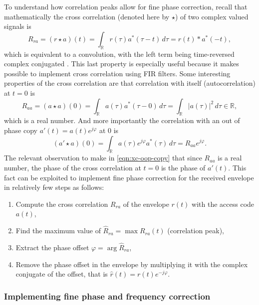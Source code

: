 To understand how correlation peaks allow for fine phase correction, recall that mathematically the cross correlation (denoted here by \(\star\)) of two complex valued signals is
\begin{equation}
	R_{ra}
	= (r \star a)(t)
	= \int_\mathbb{R} r(\tau) a^*(\tau - t) \,d\tau
	= r(t) * a^*(-t),
\end{equation}
which is equivalent to a convolution, with the left term being time-reversed complex conjugated \cite{Gallager}. This last property is especially useful because it makes possible to implement cross correlation using FIR filters. Some interesting properties of the cross correlation are that correlation with itself (autocorrelation) at \(t = 0\) is
\begin{equation}
	R_{aa} = (a \star a)(0)
	= \int_\mathbb{R} a(\tau) a^*(\tau - 0) \,d\tau
	= \int_\mathbb{R} |a(\tau)|^2 \,d\tau \in \mathbb{R},
\end{equation}
which is a real number. And more importantly the correlation with an out of phase copy \(a'(t) = a(t) e^{j\varphi}\) at 0 is
\begin{equation} \label{eqn:xc-oop-copy}
	(a' \star a)(0) 
	= \int_\mathbb{R} a(\tau)e^{j\varphi}  a^*(\tau) \,d\tau
	= R_{aa} e^{j\varphi}.
\end{equation}
The relevant observation to make in \eqref{eqn:xc-oop-copy} that since \(R_{aa}\) is a real number, the phase of the cross correlation at \(t = 0\) is the phase of \(a'(t)\). This fact can be exploited to implement fine phase correction for the received envelope in relatively few steps as follows:
\begin{enumerate}
	\item Compute the cross correlation \(R_{ra}\) of the envelope \(r(t)\) with the access code \(a(t)\),
	\item Find the maximum value of \(\hat{R}_{ra} = \max R_{ra}(t)\) (correlation peak),
	\item Extract the phase offset \(\varphi = \arg \hat{R}_{ra}\),
	\item Remove the phase offset in the envelope by multiplying it with the complex conjugate of the offset, that is \(\hat{r}(t) = r(t) e^{-j\varphi}\).
\end{enumerate}

\subsubsection{Implementing fine phase and frequency correction} \label{sec:implement-phasecorr}

